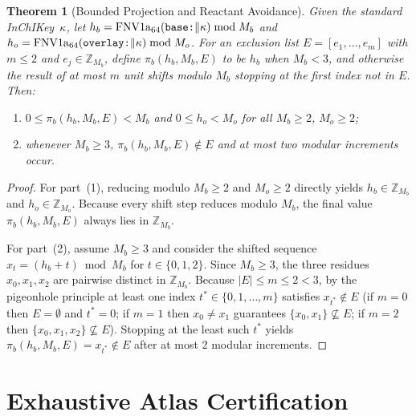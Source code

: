 \documentclass[11pt,a4paper]{article}
\theoremstyle{plain}
\newtheorem{theorem}{Theorem}[section]
\theoremstyle{definition}
\theoremstyle{remark}
\newcommand{\Z}{\mathbb{Z}}
\newcommand{\FNV}{\operatorname{FNV1a}_{64}}
\begin{document}
\begin{theorem}[Bounded Projection and Reactant Avoidance]\label{thm:projection}
  Given the standard InChIKey~\( \kappa \), let
  \( h_b = \FNV(\text{\texttt{base:}} \Vert \kappa) \bmod M_b \) and
  \( h_o = \FNV(\text{\texttt{overlay:}} \Vert \kappa) \bmod M_o \).
  For an exclusion list \( E = [e_1, \dots, e_m] \) with \( m \le 2 \) and
  \( e_j \in \Z_{M_b} \), define \( \pi_b(h_b, M_b, E) \) to be \( h_b \) when
  \( M_b < 3 \), and otherwise the result of at most \( m \) unit shifts modulo \( M_b \)
  stopping at the first index not in \( E \). Then:
  \begin{enumerate}
    \item \( 0 \le \pi_b(h_b, M_b, E) < M_b \) and \( 0 \le h_o < M_o \) for all
      \( M_b \ge 2 \), \( M_o \ge 2 \);
    \item whenever \( M_b \ge 3 \), \( \pi_b(h_b, M_b, E) \notin E \) and at most
      two modular increments occur.
  \end{enumerate}
\end{theorem}
\begin{proof}
  For part~(1), reducing modulo \( M_b \ge 2 \) and \( M_o \ge 2 \) directly yields
  \( h_b \in \Z_{M_b} \) and \( h_o \in \Z_{M_o} \). Because every shift step reduces modulo
  \( M_b \), the final value \( \pi_b(h_b, M_b, E) \) always lies in \( \Z_{M_b} \).

  For part~(2), assume \( M_b \ge 3 \) and consider the shifted sequence
  \( x_t = (h_b + t) \bmod M_b \) for \( t \in \{0, 1, 2\} \). Since \( M_b \ge 3 \), the three
  residues \( x_0, x_1, x_2 \) are pairwise distinct in \( \Z_{M_b} \). Because
  \( \lvert E \rvert \le m \le 2 < 3 \), by the pigeonhole principle at least one index
  \( t^* \in \{0, 1, \dots, m\} \) satisfies \( x_{t^*} \notin E \) (if \( m = 0 \) then
  \( E = \emptyset \) and \( t^* = 0 \); if \( m = 1 \) then \( x_0 \neq x_1 \) guarantees
  \( \{x_0, x_1\} \not\subseteq E \); if \( m = 2 \) then \( \{x_0, x_1, x_2\} \not\subseteq E \)).
  Stopping at the least such \( t^* \) yields \( \pi_b(h_b, M_b, E) = x_{t^*} \notin E \) after
  at most \( 2 \) modular increments.
\end{proof}

\section{Exhaustive Atlas Certification}\label{sec:certificate}
\end{document}
